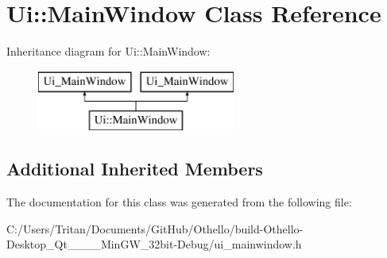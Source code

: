 \hypertarget{class_ui_1_1_main_window}{}\section{Ui\+:\+:Main\+Window Class Reference}
\label{class_ui_1_1_main_window}
Inheritance diagram for Ui\+:\+:Main\+Window\+:\begin{figure}[H]
\begin{center}
\leavevmode
\includegraphics[height=2.000000cm]{class_ui_1_1_main_window}
\end{center}
\end{figure}
\subsection*{Additional Inherited Members}


The documentation for this class was generated from the following file\+:\begin{DoxyCompactItemize}
\item 
C\+:/\+Users/\+Tritan/\+Documents/\+Git\+Hub/\+Othello/build-\/\+Othello-\/\+Desktop\+\_\+\+Qt\+\_\+\_\+\_\+\_\+\+Min\+G\+W\+\_\+32bit-\/\+Debug/ui\+\_\+mainwindow.\+h\end{DoxyCompactItemize}
